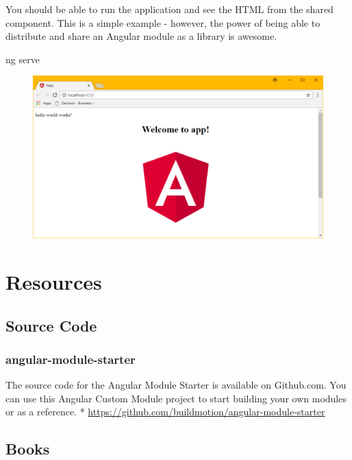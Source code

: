 \documentclass[]{book}
\newenvironment{Shaded}{\begin{snugshade}}{\end{snugshade}}
\newcommand{\NormalTok}[1]{#1}
\theoremstyle{definition}
\theoremstyle{definition}
\theoremstyle{definition}
\theoremstyle{remark}
\begin{document}
You should be able to run the application and see the HTML from the
shared component. This is a simple example - however, the power of being
able to distribute and share an Angular module as a library is awesome.

\begin{Shaded}
\begin{Highlighting}[]
\NormalTok{ng serve}
\end{Highlighting}
\end{Shaded}

\begin{figure}
\centering
\includegraphics{images/hello-world-works.png}
\caption{}
\end{figure}

\chapter{Resources}\label{resources}

\section{Source Code}\label{source-code}

\subsection{angular-module-starter}\label{angular-module-starter}

The source code for the Angular Module Starter is available on
Github.com. You can use this Angular Custom Module project to start
building your own modules or as a reference. *
\url{https://github.com/buildmotion/angular-module-starter}

\section{Books}\label{books}
\end{document}
